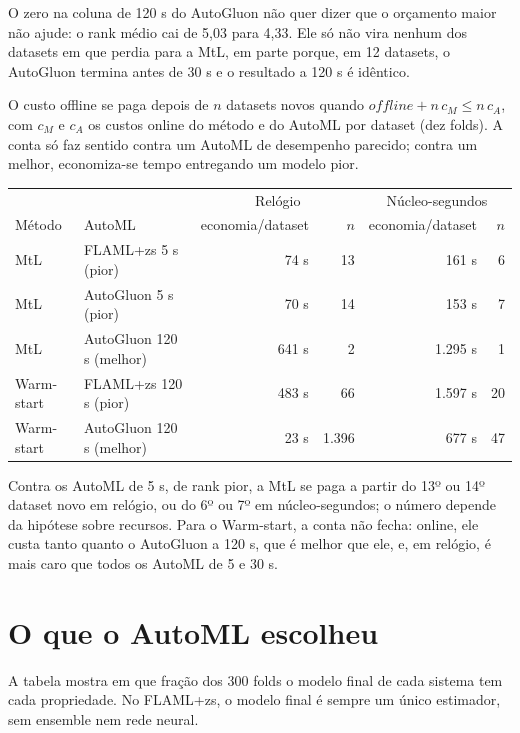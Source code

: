 \documentclass[10pt,a4paper]{article}
\begin{document}
O zero na coluna de 120 s do AutoGluon não quer dizer que o orçamento maior não ajude: o rank médio cai de 5,03 para 4,33. Ele só não vira nenhum dos datasets em que perdia para a MtL, em parte porque, em 12 datasets, o AutoGluon termina antes de 30 s e o resultado a 120 s é idêntico.

O custo offline se paga depois de $n$ datasets novos quando $\mathit{offline} + n\,c_M \leq n\,c_A$, com $c_M$ e $c_A$ os custos online do método e do AutoML por dataset (dez folds). A conta só faz sentido contra um AutoML de desempenho parecido; contra um melhor, economiza-se tempo entregando um modelo pior.

\begin{center}\small
\begin{tabular}{llrrrr}
\toprule
 & & \multicolumn{2}{c}{Relógio} & \multicolumn{2}{c}{Núcleo-segundos} \\
Método & AutoML & economia/dataset & $n$ & economia/dataset & $n$ \\
\midrule
MtL & FLAML+zs 5 s (pior) & 74 s & 13 & 161 s & 6 \\
MtL & AutoGluon 5 s (pior) & 70 s & 14 & 153 s & 7 \\
MtL & AutoGluon 120 s (melhor) & 641 s & 2 & 1.295 s & 1 \\
Warm-start & FLAML+zs 120 s (pior) & 483 s & 66 & 1.597 s & 20 \\
Warm-start & AutoGluon 120 s (melhor) & 23 s & 1.396 & 677 s & 47 \\
\bottomrule
\end{tabular}
\end{center}

Contra os AutoML de 5 s, de rank pior, a MtL se paga a partir do 13º ou 14º dataset novo em relógio, ou do 6º ou 7º em núcleo-segundos; o número depende da hipótese sobre recursos. Para o Warm-start, a conta não fecha: online, ele custa tanto quanto o AutoGluon a 120 s, que é melhor que ele, e, em relógio, é mais caro que todos os AutoML de 5 e 30 s.

\section{O que o AutoML escolheu}

A tabela mostra em que fração dos 300 folds o modelo final de cada sistema tem cada propriedade. No FLAML+zs, o modelo final é sempre um único estimador, sem ensemble nem rede neural.
\end{document}

